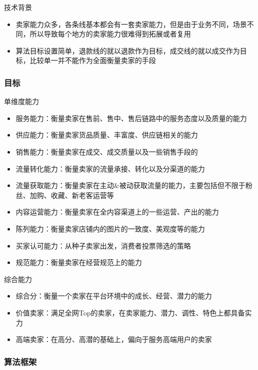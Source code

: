 技术背景

\begin{itemize}\setlength{\itemsep}{-6pt}
	\item
	卖家能力众多，各条线基本都会有一套卖家能力，但是由于业务不同，场景不同，所以导致每个地方的卖家能力很难得到拓展或者复用
	\item
	算法目标设置简单，退款线的就以退款作为目标，成交线的就以成交作为目标，比较单一并不能作为全面衡量卖家的手段
\end{itemize}

\subsubsection{目标}\label{ux76eeux6807}

单维度能力

\begin{itemize}\setlength{\itemsep}{-6pt}
	\item
	服务能力：衡量卖家在售前、售中、售后链路中的服务态度以及质量的能力
	\item
	供应能力：衡量卖家货品质量、丰富度、供应链相关的能力
	\item
	销售能力：衡量卖家在成交、成交质量以及一些销售手段的
	\item
	流量转化能力：衡量卖家的流量承接、转化以及分渠道的能力
	\item
	流量获取能力：衡量卖家在主动\&被动获取流量的能力，主要包括但不限于粉丝、加购、收藏、新老客运营等
	\item
	内容运营能力：衡量卖家在全内容渠道上的一些运营、产出的能力
	\item
	陈列能力：衡量卖家店铺内的图片的一致度、美观度等的能力
	\item
	买家认可能力：从种子卖家出发，消费者投票筛选的策略
	\item
	规范能力：衡量卖家在经营规范上的能力
\end{itemize}

综合能力

\begin{itemize}\setlength{\itemsep}{-6pt}
	\item
	综合分：衡量一个卖家在平台环境中的成长、经营、潜力的能力
	\item
	价值卖家：满足全网Top的卖家，在卖家能力、潜力、调性、特色上都具备实力
	\item
	高端卖家：在高分、高潜的基础上，偏向于服务高端用户的卖家
\end{itemize}

\subsubsection{算法框架}\label{ux7b97ux6cd5ux6846ux67b6}

